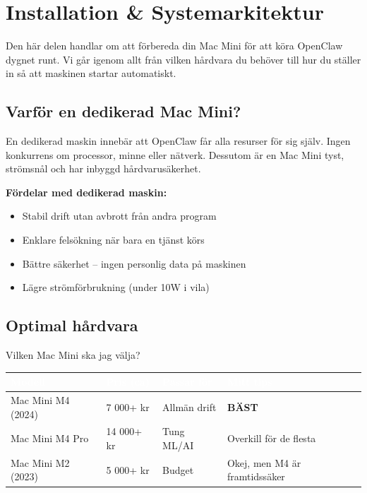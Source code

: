 \documentclass[12pt,a4paper,swedish]{article}
\begin{document}
\newpage

\section{Installation \& Systemarkitektur}
\label{sec:del1}

Den här delen handlar om att förbereda din Mac Mini för att köra OpenClaw dygnet runt. Vi går igenom allt från vilken hårdvara du behöver till hur du ställer in så att maskinen startar automatiskt.

\subsection{Varför en dedikerad Mac Mini?}
\label{sec:varfor-mini}

En dedikerad maskin innebär att OpenClaw får alla resurser för sig själv. Ingen konkurrens om processor, minne eller nätverk. Dessutom är en Mac Mini tyst, strömsnål och har inbyggd hårdvarusäkerhet.

\bigskip

\textbf{Fördelar med dedikerad maskin:}
\begin{itemize}
    \item Stabil drift utan avbrott från andra program
    \item Enklare felsökning när bara en tjänst körs
    \item Bättre säkerhet – ingen personlig data på maskinen
    \item Lägre strömförbrukning (under 10W i vila)
\end{itemize}

\subsection{Optimal hårdvara}
\label{sec:hardvara}

 Vilken Mac Mini ska jag välja?

\begin{table}[h!]
\centering
\begin{tabular}{|l|l|l|p{3cm}|}
\hline
\rowcolor{primary}
\textcolor{white}{\textbf{Modell}} & \textcolor{white}{\textbf{Pris (ca)}} & \textcolor{white}{\textbf{Passar för}} & \textcolor{white}{\textbf{Mitt tips}} \\
\hline
Mac Mini M4 (2024) & 7 000+ kr & Allmän drift & \textbf{BÄST} \\
\hline
Mac Mini M4 Pro & 14 000+ kr & Tung ML/AI & Overkill för de flesta \\
\hline
Mac Mini M2 (2023) & 5 000+ kr & Budget & Okej, men M4 är framtidssäker \\
\hline
\end{tabular}
\end{table}
\end{document}
